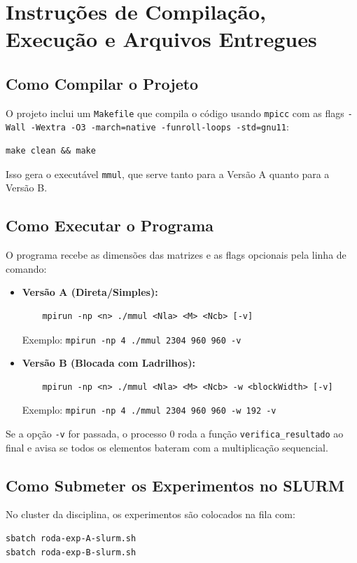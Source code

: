 \documentclass[12pt, a4paper, twoside, chapter=TITLE, subsection=TITLE, section=TITLE, subsubsection=TITLE, english, brazil]{abntex2}
\begin{document}
\chapter{Instruções de Compilação, Execução e Arquivos Entregues}

\section{Como Compilar o Projeto}
O projeto inclui um \texttt{Makefile} que compila o código usando \texttt{mpicc} com as flags \texttt{-Wall -Wextra -O3 -march=native -funroll-loops -std=gnu11}:
\begin{verbatim}
make clean && make
\end{verbatim}
Isso gera o executável \texttt{mmul}, que serve tanto para a Versão A quanto para a Versão B.

\section{Como Executar o Programa}
O programa recebe as dimensões das matrizes e as flags opcionais pela linha de comando:
\begin{itemize}
    \item \textbf{Versão A (Direta/Simples):}
    \begin{verbatim}
    mpirun -np <n> ./mmul <Nla> <M> <Ncb> [-v]
    \end{verbatim}
    Exemplo: \texttt{mpirun -np 4 ./mmul 2304 960 960 -v}
    \item \textbf{Versão B (Blocada com Ladrilhos):}
    \begin{verbatim}
    mpirun -np <n> ./mmul <Nla> <M> <Ncb> -w <blockWidth> [-v]
    \end{verbatim}
    Exemplo: \texttt{mpirun -np 4 ./mmul 2304 960 960 -w 192 -v}
\end{itemize}
Se a opção \texttt{-v} for passada, o processo 0 roda a função \nolinkurl{verifica_resultado} ao final e avisa se todos os elementos bateram com a multiplicação sequencial.

\section{Como Submeter os Experimentos no SLURM}
No cluster da disciplina, os experimentos são colocados na fila com:
\begin{verbatim}
sbatch roda-exp-A-slurm.sh
sbatch roda-exp-B-slurm.sh
\end{verbatim}
\end{document}
